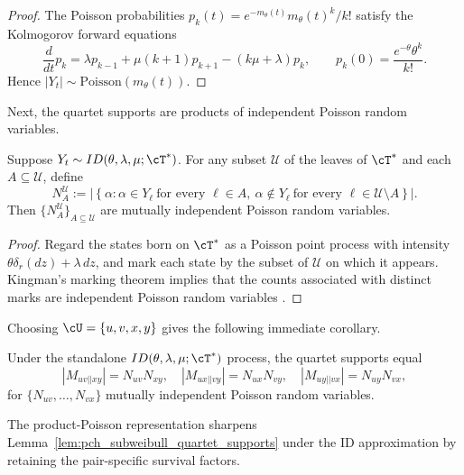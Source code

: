 \begin{proof}
    The Poisson probabilities $p_k(t)=e^{-m_\theta(t)}m_\theta(t)^k/k!$ satisfy the Kolmogorov forward equations
    \[\frac{d}{dt}p_k = \lambda p_{k-1} + \mu (k+1) p_{k+1} - (k\mu + \lambda) p_k,
    \qquad p_k(0)=\frac{e^{-\theta}\theta^k}{k!}.\]
    Hence $|Y_t|\sim\mathrm{Poisson}(m_\theta(t))$.
\end{proof}

Next, the quartet supports are products of independent Poisson random variables.

\begin{lemma}
\label{lem:quartet_supports_under_ID_process}
    Suppose $Y_t \sim ID(\theta, \lambda, \mu; \cT^*)$. For any subset $\mathcal U$
    of the leaves of $\cT^*$ and each $A\subseteq\mathcal U$, define
    \[N_A^{\mathcal U}:=\left|\left\{\alpha:
    \alpha\in Y_\ell\ \text{for every }\ell\in A,
    \ \alpha\notin Y_\ell\ \text{for every }\ell\in\mathcal U\setminus A
    \right\}\right|.\]
    \noindent Then $\{N_A^{\mathcal U}\}_{A\subseteq\mathcal U}$ are mutually independent Poisson random variables.
\end{lemma}

\begin{proof}
    Regard the states born on $\cT^*$ as a Poisson point process with intensity
    $\theta\delta_r(dz)+\lambda\,dz$, and mark each state by the subset of $\mathcal U$ on which it appears.
    Kingman's marking theorem implies that the counts associated with distinct marks are independent Poisson random variables
    \cite{kingman1992_poisson_processes}.
\end{proof}

Choosing $\cU=\{u,v,x,y\}$ gives the following immediate corollary.

\begin{corollary}\label{cor:id_process_supports_poisson_products}
    Under the standalone $ID(\theta, \lambda, \mu; \cT^*)$ process, the quartet supports equal
    \[|M_{uv||xy}| = N_{uv}N_{xy}, \quad |M_{ux||vy}| = N_{ux}N_{vy}, \quad |M_{uy||vx}| = N_{uy}N_{vx},\]
    \noindent for $\{N_{uv},\ldots,N_{vx}\}$ mutually independent Poisson random variables.
\end{corollary}

\noindent The product-Poisson representation sharpens
Lemma~\ref{lem:pch_subweibull_quartet_supports} under the ID approximation by retaining
the pair-specific survival factors.

